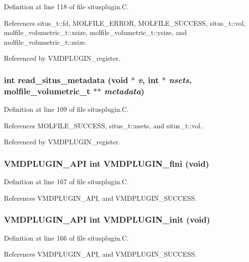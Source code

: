 Definition at line 118 of file situsplugin.C.

References situs\_\-t::fd, MOLFILE\_\-ERROR, MOLFILE\_\-SUCCESS, situs\_\-t::vol, molfile\_\-volumetric\_\-t::xsize, molfile\_\-volumetric\_\-t::ysize, and molfile\_\-volumetric\_\-t::zsize.

Referenced by VMDPLUGIN\_\-register.
\subsubsection{\setlength{\rightskip}{0pt plus 5cm}int read\_\-situs\_\-metadata (void $\ast$ {\em v}, int $\ast$ {\em nsets}, {\bf molfile\_\-volumetric\_\-t} $\ast$$\ast$ {\em metadata})\hspace{0.3cm}{\tt  [static]}}\label{situsplugin_8C_a2}




Definition at line 109 of file situsplugin.C.

References MOLFILE\_\-SUCCESS, situs\_\-t::nsets, and situs\_\-t::vol.

Referenced by VMDPLUGIN\_\-register.
\subsubsection{\setlength{\rightskip}{0pt plus 5cm}VMDPLUGIN\_\-API int VMDPLUGIN\_\-fini (void)}\label{situsplugin_8C_a6}




Definition at line 167 of file situsplugin.C.

References VMDPLUGIN\_\-API, and VMDPLUGIN\_\-SUCCESS.
\subsubsection{\setlength{\rightskip}{0pt plus 5cm}VMDPLUGIN\_\-API int VMDPLUGIN\_\-init (void)}\label{situsplugin_8C_a5}




Definition at line 166 of file situsplugin.C.

References VMDPLUGIN\_\-API, and VMDPLUGIN\_\-SUCCESS.
